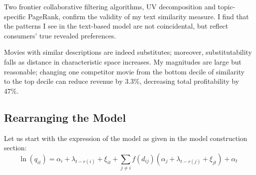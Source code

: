 \documentclass{article}
\begin{document}
Two frontier collaborative filtering algorithms, UV decomposition and topic-specific PageRank, confirm the validity of my text similarity measure. I find that the patterns I see in the text-based model are not coincidental, but reflect consumers' true revealed preferences.

Movies with similar descriptions are indeed substitutes; moreover, substitutability falls as distance in characteristic space increases. My magnitudes are large but reasonable; changing one competitor movie from the bottom decile of similarity to the top decile can reduce revenue by 3.3\%, decreasing total profitability by 47\%. 

\printbibliography

\pagebreak

\begin{appendices}

\section{Rearranging the Model}
\label{app:rearrangement}

Let us start with the expression of the model as given in the model construction section: $$\ln(q_{it}) = \alpha_i + \lambda_{t - r(i)} + \xi_{it} + \sum_{j \neq i} f(d_{ij}) (\alpha_j + \lambda_{t - r(j)} + \xi_{jt}) + \alpha_{t}$$


\end{appendices}
\end{document}
